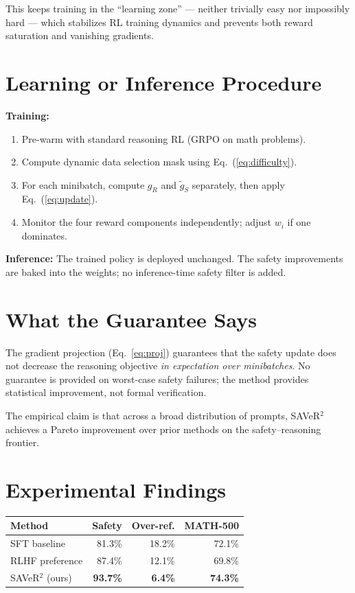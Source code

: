 \documentclass[10pt,twocolumn]{article}
\begin{document}
This keeps training in the ``learning zone'' --- neither trivially easy nor impossibly hard --- which stabilizes RL training dynamics and prevents both reward saturation and vanishing gradients.

\section{Learning or Inference Procedure}

\textbf{Training:}
\begin{enumerate}[leftmargin=1.5em,itemsep=1pt]
  \item Pre-warm with standard reasoning RL (GRPO on math problems).
  \item Compute dynamic data selection mask using Eq.~(\ref{eq:difficulty}).
  \item For each minibatch, compute $g_R$ and $\tilde{g}_S$ separately, then apply Eq.~(\ref{eq:update}).
  \item Monitor the four reward components independently; adjust $w_i$ if one dominates.
\end{enumerate}

\textbf{Inference:} The trained policy is deployed unchanged.
The safety improvements are baked into the weights; no inference-time safety filter is added.

\section{What the Guarantee Says}

The gradient projection (Eq.~\ref{eq:proj}) guarantees that the safety update does not decrease the reasoning objective \emph{in expectation over minibatches}.
No guarantee is provided on worst-case safety failures; the method provides statistical improvement, not formal verification.

The empirical claim is that across a broad distribution of prompts, SAVeR$^2$ achieves a Pareto improvement over prior methods on the safety--reasoning frontier.

\section{Experimental Findings}

\begin{center}
\small
\begin{tabular}{lrrr}
\toprule
\textbf{Method} & \textbf{Safety} & \textbf{Over-ref.} & \textbf{MATH-500} \\
\midrule
SFT baseline & 81.3\% & 18.2\% & 72.1\% \\
RLHF preference & 87.4\% & 12.1\% & 69.8\% \\
SAVeR$^2$ (ours) & \textbf{93.7\%} & \textbf{6.4\%} & \textbf{74.3\%} \\
\bottomrule
\end{tabular}
\end{center}
\end{document}
